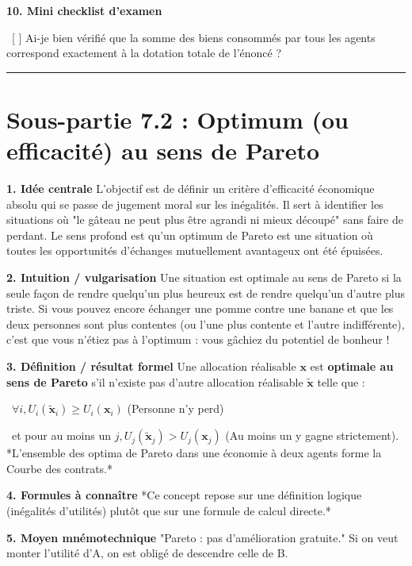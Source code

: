 \documentclass[11pt, a4paper]{report}
\begin{document}
\textbf{10. Mini checklist d’examen}
\par \textbullet\ [ ] Ai-je bien vérifié que la somme des biens consommés par tous les agents correspond exactement à la dotation totale de l'énoncé ?

\vspace{1cm}\hrule\vspace{1cm}

\section{Sous-partie 7.2 : Optimum (ou efficacité) au sens de Pareto}

\textbf{1. Idée centrale}
L'objectif est de définir un critère d'efficacité économique absolu qui se passe de jugement moral sur les inégalités. Il sert à identifier les situations où "le gâteau ne peut plus être agrandi ni mieux découpé" sans faire de perdant. Le sens profond est qu'un optimum de Pareto est une situation où toutes les opportunités d'échanges mutuellement avantageux ont été épuisées.

\textbf{2. Intuition / vulgarisation}
Une situation est optimale au sens de Pareto si la seule façon de rendre quelqu'un plus heureux est de rendre quelqu'un d'autre plus triste. Si vous pouvez encore échanger une pomme contre une banane et que les deux personnes sont plus contentes (ou l'une plus contente et l'autre indifférente), c'est que vous n'étiez pas à l'optimum : vous gâchiez du potentiel de bonheur !

\textbf{3. Définition / résultat formel}
Une allocation réalisable $\mathbf{x}$ est \textbf{optimale au sens de Pareto} s'il n'existe pas d'autre allocation réalisable $\mathbf{\tilde{x}}$ telle que :
\par \textbullet\ $\forall i, U_i(\mathbf{\tilde{x}}_i) \ge U_i(\mathbf{x}_i)$ (Personne n'y perd)
\par \textbullet\ et pour au moins un $j, U_j(\mathbf{\tilde{x}}_j) > U_j(\mathbf{x}_j)$ (Au moins un y gagne strictement).
*L'ensemble des optima de Pareto dans une économie à deux agents forme la Courbe des contrats.*

\textbf{4. Formules à connaître}
*Ce concept repose sur une définition logique (inégalités d'utilités) plutôt que sur une formule de calcul directe.*

\textbf{5. Moyen mnémotechnique}
"Pareto : pas d'amélioration gratuite." Si on veut monter l'utilité d'A, on est obligé de descendre celle de B.
\end{document}
